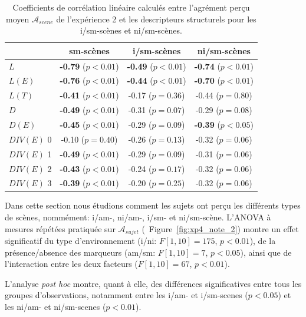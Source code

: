 \begin{table}[t]
\centering
\begin{tabular}{l c c c} 
               & sm-scènes                    & i/sm-scènes                & ni/sm-scènes    \\
\hline
$L$            & \textbf{-0.79} ($p<0.01$)    & \textbf{-0.49} ($p<0.01$)  & \textbf{-0.74} ($p<0.01$)\\
$L(E)$         & \textbf{-0.76} ($p<0.01$)    & \textbf{-0.44} ($p<0.01$)  & \textbf{-0.70} ($p<0.01$)\\
$L(T)$         & \textbf{-0.41} ($p<0.01$)    & -0.17 ($p=0.36$)           & -0.44 ($p=0.80$) \\
$D$            & \textbf{-0.49} ($p<0.01$)    & -0.31 ($p=0.07$)           & -0.29 ($p=0.08$)\\
$D(E)$         & \textbf{-0.45} ($p<0.01$)    & -0.29 ($p=0.09$)           & \textbf{-0.39} ($p<0.05$)\\
$DIV(E)$ 0     &         -0.10  ($p=0.40$)    & -0.26 ($p=0.13$)           & -0.32 ($p=0.06$)\\
$DIV(E)$ 1     & \textbf{-0.49} ($p<0.01$)    & -0.29 ($p=0.09$)           & -0.31 ($p=0.06$)\\
$DIV(E)$ 2     & \textbf{-0.43} ($p<0.01$)    & -0.24 ($p=0.17$)           & -0.32 ($p=0.06$)\\
$DIV(E)$ 3     & \textbf{-0.39} ($p<0.01$)    & -0.20 ($p=0.25$)           & -0.32 ($p=0.06$)\\
\hline
\end{tabular}
\vspace{0.5mm}
\caption{Coefficients de corrélation linéaire calculés entre l'agrément perçu moyen $\mathcal{A}_{scene}$ de l'expérience 2 et les descripteurs structurels pour les i/sm-scènes et ni/sm-scènes.}
\label{tab:corrSmXP4}
\end{table}

Dans cette section nous étudions comment les sujets ont perçu les différents types de scènes, nommément: i/am-, ni/am-, i/sm- et ni/sm-scène. L'ANOVA à mesures répétées pratiquée sur $\mathcal{A}_{sujet}$ (\cf~Figure~\ref{fig:xp4_note_2}) montre un effet significatif du type d'environnement (i/ni: $F[1,10]=175$, $p<0.01$), de la présence/absence des marqueurs (am/sm: $F[1,10]=7$, $p<0.05$), ainsi que de l'interaction entre les deux facteurs ($F[1,10]=67$, $p<0.01$).

L'analyse \emph{post hoc} montre, quant à elle, des différences significatives entre tous les groupes d'observations, notamment entre les i/am- et i/sm-scenes ($p<0.05$) et les ni/am- et ni/sm-scenes ($p<0.01$).

